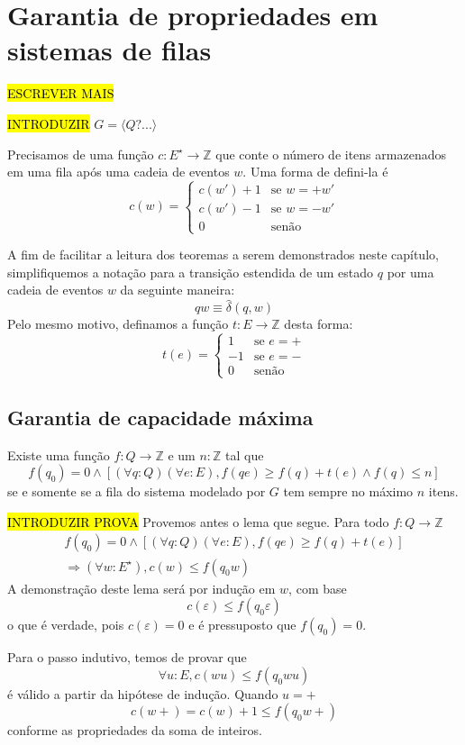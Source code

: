 \chapter{Garantia de propriedades em sistemas de filas}

\hl{ESCREVER MAIS}

\hl{INTRODUZIR} $G = \langle Q? ... \rangle$

Precisamos de uma função $c : E^\star \to \mathbb{Z}$ que conte o número de itens armazenados em uma fila após uma cadeia de eventos $w$. Uma forma de defini-la é $$c(w) = \begin{cases}
c(w') + 1 & \text{se $w=+w'$}\\
c(w') - 1 & \text{se $w=-w'$}\\
0 & \text{senão}
\end{cases}$$

A fim de facilitar a leitura dos teoremas a serem demonstrados neste capítulo, simplifiquemos a notação para a transição estendida de um estado $q$ por uma cadeia de eventos $w$ da seguinte maneira: $$qw \equiv \hat{\delta}(q,w)$$ Pelo mesmo motivo, definamos a função $t : E \to \mathbb{Z}$ desta forma: $$t(e) = \begin{cases}
1 & \text{se $e=+$} \\
-1 & \text{se $e=-$} \\
0 & \text{senão}
\end{cases}$$

\section{Garantia de capacidade máxima}

Existe uma função $f : Q \to \mathbb{Z}$ e um $n : \mathbb{Z}$ tal que \begin{equation}
f(q_0) = 0 \wedge [(\forall q : Q)(\forall e : E), f(qe) \geq f(q) + t(e) \wedge f(q) \leq n]
\end{equation} se e somente se a fila do sistema modelado por $G$ tem sempre no máximo $n$ itens.

\hl{INTRODUZIR PROVA} Provemos antes o lema que segue. Para todo $f : Q \to \mathbb{Z}$\begin{equation}
\begin{aligned}
f(q_0) = 0 \wedge [(\forall q : Q)(\forall e : E), f(qe) \geq f(q) + t(e)]\\\Rightarrow (\forall w : E^\star), c(w) \leq f(q_0w)
\end{aligned}
\end{equation} A demonstração deste lema será por indução em $w$, com base $$c(\varepsilon) \leq f(q_0\varepsilon)$$ o que é verdade, pois $c(\varepsilon) = 0$ e é pressuposto que $f(q_0) = 0$.

Para o passo indutivo, temos de provar que $$\forall u : E, c(wu) \leq f(q_0wu)$$ é válido a partir da hipótese de indução. Quando $u = +$ $$c(w+) = c(w) + 1 \leq f(q_0w+)$$ conforme as propriedades da soma de inteiros.
